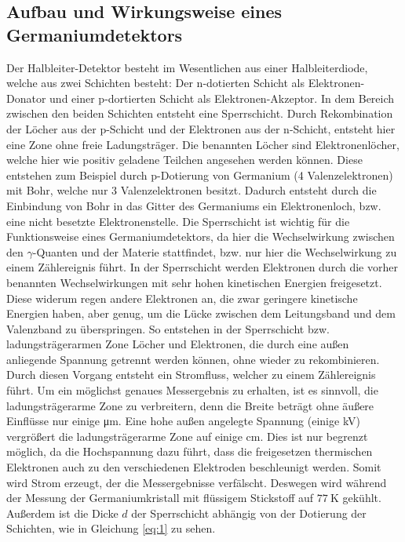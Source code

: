 \subsection{Aufbau und Wirkungsweise eines Germaniumdetektors}
Der Halbleiter-Detektor besteht im Wesentlichen aus einer Halbleiterdiode,
welche aus zwei Schichten besteht: Der n-dotierten Schicht als
Elektronen-Donator und einer p-dortierten Schicht als Elektronen-Akzeptor.
In dem Bereich zwischen den beiden Schichten entsteht eine Sperrschicht. Durch
Rekombination der Löcher aus der p-Schicht und der Elektronen aus der n-Schicht,
entsteht hier eine Zone ohne freie Ladungsträger.
Die benannten Löcher sind Elektronenlöcher, welche hier wie positiv geladene
Teilchen angesehen werden können. Diese entstehen zum Beispiel durch p-Dotierung von Germanium
(4 Valenzelektronen) mit Bohr, welche nur 3 Valenzelektronen besitzt. Dadurch
entsteht durch die Einbindung von Bohr in das Gitter des Germaniums ein
Elektronenloch, bzw. eine nicht besetzte Elektronenstelle.
Die Sperrschicht ist wichtig für die Funktionsweise eines Germaniumdetektors,
da hier die Wechselwirkung zwischen den $\gamma$-Quanten und der Materie
stattfindet, bzw. nur hier die Wechselwirkung zu einem Zählereignis führt.
In der Sperrschicht werden Elektronen durch die vorher benannten Wechselwirkungen
mit sehr hohen kinetischen Energien freigesetzt. Diese widerum regen andere
Elektronen an, die zwar geringere kinetische Energien haben, aber genug, um die
Lücke zwischen dem Leitungsband und dem Valenzband zu überspringen. So
entstehen in der Sperrschicht bzw. ladungsträgerarmen Zone Löcher und Elektronen,
die durch eine außen anliegende Spannung getrennt werden können, ohne wieder zu
rekombinieren. Durch diesen Vorgang entsteht ein Stromfluss, welcher zu einem
Zählereignis führt.
Um ein möglichst genaues Messergebnis zu erhalten, ist es sinnvoll, die
ladungsträgerarme Zone zu verbreitern, denn die Breite beträgt ohne äußere Einflüsse
nur einige \si{\micro\meter}. Eine hohe außen angelegte Spannung (einige \si{\kilo\volt}) vergrößert
die ladungsträgerarme Zone auf einige \si{\centi\meter}.
Dies ist nur begrenzt möglich, da die Hochspannung dazu führt, dass die
freigesetzen thermischen Elektronen auch zu den verschiedenen Elektroden
beschleunigt werden. Somit wird Strom erzeugt, der die Messergebnisse
verfälscht. Deswegen wird während der Messung der Germaniumkristall mit
flüssigem Stickstoff auf $\SI{77}{\kelvin}$ gekühlt.
Außerdem ist die Dicke $d$ der Sperrschicht abhängig von der Dotierung
der Schichten, wie in Gleichung \eqref{eq:1} zu sehen.

